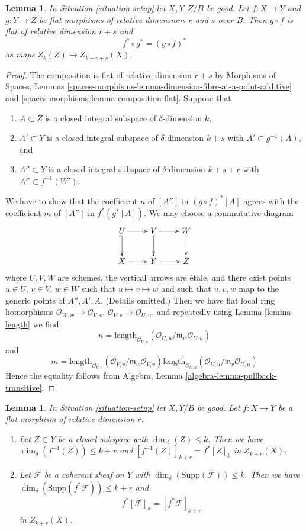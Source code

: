 \documentclass{stacks-project}
\theoremstyle{plain}
\newtheorem{lemma}[subsection]{Lemma}
\theoremstyle{definition}
\theoremstyle{remark}
\numberwithin{equation}{subsection}
\begin{document}
\begin{lemma}
\label{lemma-compose-flat-pullback}
In Situation \ref{situation-setup} let $X, Y, Z/B$ be good.
Let $f : X \to Y$ and $g : Y \to Z$ be flat morphisms of relative dimensions
$r$ and $s$ over $B$. Then $g \circ f$ is flat of relative dimension
$r + s$ and
$$
f^* \circ g^* = (g \circ f)^*
$$
as maps $Z_k(Z) \to Z_{k + r + s}(X)$.
\end{lemma}

\begin{proof}
The composition is flat of relative dimension $r + s$ by
Morphisms of Spaces, Lemmas
\ref{spaces-morphisms-lemma-dimension-fibre-at-a-point-additive} and
\ref{spaces-morphisms-lemma-composition-flat}.
Suppose that
\begin{enumerate}
\item $A \subset Z$ is a closed integral subspace of $\delta$-dimension $k$,
\item $A' \subset Y$ is a closed integral subspace of $\delta$-dimension
$k + s$ with $A' \subset g^{-1}(A)$, and
\item $A'' \subset Y$ is a closed integral subspace of $\delta$-dimension
$k + s + r$ with $A'' \subset f^{-1}(W')$.
\end{enumerate}
We have to show that the coefficient $n$ of $[A'']$ in $(g \circ f)^*[A]$
agrees with the coefficient $m$ of $[A'']$ in $f^*(g^*[A])$. We may choose
a commutative diagram
$$
\xymatrix{
U \ar[d] \ar[r] & V \ar[d] \ar[r] & W \ar[d] \\
X \ar[r] & Y \ar[r] & Z
}
$$
where $U, V, W$ are schemes, the vertical arrows are \'etale, and
there exist points $u \in U$, $v \in V$, $w \in W$ such that
$u \mapsto v \mapsto w$ and such that $u, v, w$ map to the generic
points of $A'', A', A$. (Details omitted.)
Then we have flat local ring homorphisms
$\mathcal{O}_{W, w} \to \mathcal{O}_{V, v}$,
$\mathcal{O}_{V, v} \to \mathcal{O}_{U, u}$,
and repeatedly using Lemma \ref{lemma-length}
we find
$$
n = \text{length}_{\mathcal{O}_{U, u}}(
\mathcal{O}_{U, u}/\mathfrak m_w\mathcal{O}_{U, u})
$$
and
$$
m =
\text{length}_{\mathcal{O}_{V, v}}(
\mathcal{O}_{V, v}/\mathfrak m_w\mathcal{O}_{V, v})
\text{length}_{\mathcal{O}_{U, u}}(
\mathcal{O}_{U, u}/\mathfrak m_v\mathcal{O}_{U, u})
$$
Hence the equality follows from
Algebra, Lemma \ref{algebra-lemma-pullback-transitive}.
\end{proof}

\begin{lemma}
\label{lemma-pullback-coherent}
In Situation \ref{situation-setup} let $X, Y/B$ be good.
Let $f : X \to Y$ be a flat morphism of relative dimension $r$.
\begin{enumerate}
\item Let $Z \subset Y$ be a closed subspace with
$\dim_\delta(Z) \leq k$. Then we have
$\dim_\delta(f^{-1}(Z)) \leq k + r$
and $[f^{-1}(Z)]_{k + r} = f^*[Z]_k$ in $Z_{k + r}(X)$.
\item Let $\mathcal{F}$ be a coherent sheaf on $Y$ with
$\dim_\delta(\text{Supp}(\mathcal{F})) \leq k$.
Then we have $\dim_\delta(\text{Supp}(f^*\mathcal{F})) \leq k + r$
and
$$
f^*[{\mathcal F}]_k = [f^*{\mathcal F}]_{k+r}
$$
in $Z_{k + r}(X)$.
\end{enumerate}
\end{lemma}
\end{document}

